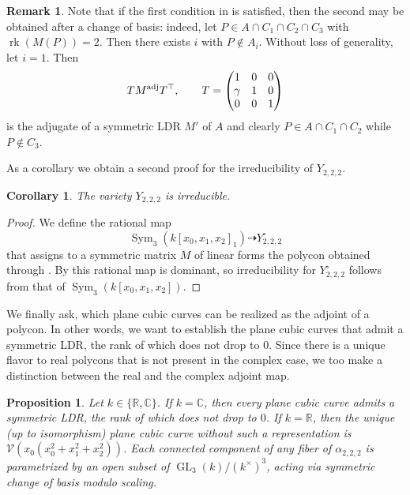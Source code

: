\documentclass[a4paper,10pt]{amsart}
\theoremstyle{definition}
\newtheorem{rem}[defin]{Remark}
\theoremstyle{plain}
\newtheorem{prop}[defin]{Proposition}
\newtheorem{cor}[defin]{Corollary}
\newcommand{\rk}{\operatorname{rk}}
\newcommand{\cV}{{\mathcal V}}
\newcommand{\C}{{\mathbb C}}
\newcommand{\R}{{\mathbb R}}
\begin{document}
\begin{rem}
 Note that if the first condition in  is satisfied, then the second may be obtained after a change of basis: indeed, let $P \in A \cap C_1 \cap C_2 \cap C_3$ with $\rk(M(P)) = 2$. Then there exists $i$ with $P \not \in A_i$. Without loss of generality, let $i=1$. Then
 \begin{equation*}
     T M^{\textup{adj}} T^\top, \qquad T = \begin{pmatrix}
         1 & 0 & 0 \\
         \gamma & 1 & 0 \\
         0 & 0 & 1
     \end{pmatrix}
 \end{equation*}
 is the adjugate of a symmetric LDR $M'$ of $A$ and clearly $P \in A \cap C_1 \cap C_2$ while $P \not \in C_3$.
\end{rem}

As a corollary we obtain a second proof for the irreducibility of $Y_{2,2,2}$.

\begin{cor} \label{cor:Yirred}
 The variety $Y_{2,2,2}$ is irreducible.
\end{cor}

\begin{proof}
 We define the rational map
 \begin{equation*}
     \operatorname{Sym}_3(k[x_0,x_1,x_2]_1) \dashrightarrow Y_{2,2,2}^\circ
 \end{equation*}
 that assigns to a symmetric matrix $M$ of linear forms the polycon obtained through . By  this rational map is dominant, so irreducibility for $Y_{2,2,2}^\circ$ follows from that of $\operatorname{Sym}_3(k[x_0,x_1,x_2])$.
\end{proof}

We finally ask, which plane cubic curves can be realized as the adjoint of a polycon. In other words, we want to establish the plane cubic curves that admit a symmetric LDR, the rank of which does not drop to $0$. Since there is a unique flavor to real polycons that is not present in the complex case, we too make a distinction between the real and the complex adjoint map.

\begin{prop} \label{prop: fiber222}
 Let $k \in \{\R,\C\}$. If $k = \C$, then every plane cubic curve admits a symmetric LDR, the rank of which does not drop to $0$. If $k = \R$, then the unique (up to isomorphism) plane cubic curve without such a representation is $\cV(x_0(x_0^2+x_1^2+x_2^2))$. Each connected component of any fiber of $\alpha_{2,2,2}$ is parametrized by an open subset of $\operatorname{GL}_3(k)/(k^\times)^3$, acting via symmetric change of basis modulo scaling.
\end{prop}
\end{document}
